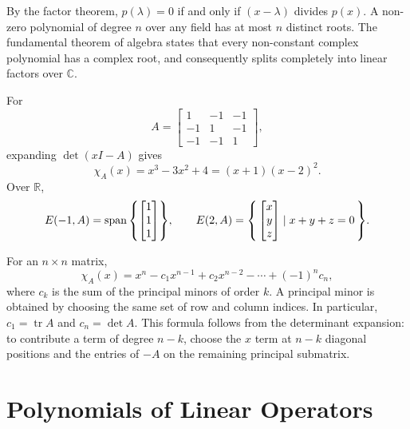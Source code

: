 By the factor theorem, $p(\lambda)=0$ if and only if $(x-\lambda)$ divides $p(x)$. A non-zero polynomial of degree $n$ over any field has at most $n$ distinct roots. The fundamental theorem of algebra states that every non-constant complex polynomial has a complex root, and consequently splits completely into linear factors over $\mathbb C$.

\begin{Example}\label{ex:ThreeByThreeEigenvalues}
For
\begin{equation*}
A=\begin{bmatrix}1&-1&-1\\-1&1&-1\\-1&-1&1\end{bmatrix},
\end{equation*}
expanding $\det(xI-A)$ gives
\begin{equation*}
\chi_A(x)=x^3-3x^2+4=(x+1)(x-2)^2.
\end{equation*}
Over $\mathbb R$,
\begin{equation*}
E(-1,A)=\operatorname{span}\qty{\begin{bmatrix}1\\1\\1\end{bmatrix}},\qquad E(2,A)=\qty{\, \begin{bmatrix}x\\y\\z\end{bmatrix} \mid x+y+z=0 \,}.
\end{equation*}
\end{Example}

\begin{Remark*}
For an $n\times n$ matrix,
\begin{equation*}
\chi_A(x)=x^n-c_1x^{n-1}+c_2x^{n-2}-\cdots+(-1)^nc_n,
\end{equation*}
where $c_k$ is the sum of the principal minors of order $k$. A principal minor is obtained by choosing the same set of row and column indices. In particular, $c_1=\operatorname{tr}A$ and $c_n=\det A$. This formula follows from the determinant expansion: to contribute a term of degree $n-k$, choose the $x$ term at $n-k$ diagonal positions and the entries of $-A$ on the remaining principal submatrix.
\end{Remark*}

\section{Polynomials of Linear Operators}\label{sec:OperatorPolynomials}

